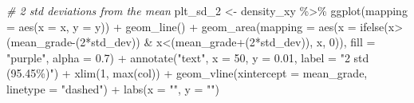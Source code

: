 \documentclass[
]{article}
\newenvironment{Shaded}{\begin{snugshade}}{\end{snugshade}}
\newcommand{\AttributeTok}[1]{\textcolor[rgb]{0.77,0.63,0.00}{#1}}
\newcommand{\CommentTok}[1]{\textcolor[rgb]{0.56,0.35,0.01}{\textit{#1}}}
\newcommand{\DecValTok}[1]{\textcolor[rgb]{0.00,0.00,0.81}{#1}}
\newcommand{\FloatTok}[1]{\textcolor[rgb]{0.00,0.00,0.81}{#1}}
\newcommand{\FunctionTok}[1]{\textcolor[rgb]{0.00,0.00,0.00}{#1}}
\newcommand{\NormalTok}[1]{#1}
\newcommand{\OtherTok}[1]{\textcolor[rgb]{0.56,0.35,0.01}{#1}}
\newcommand{\SpecialCharTok}[1]{\textcolor[rgb]{0.00,0.00,0.00}{#1}}
\newcommand{\StringTok}[1]{\textcolor[rgb]{0.31,0.60,0.02}{#1}}
\begin{document}
\begin{Shaded}
\begin{Highlighting}[]
\CommentTok{\# 2 std deviations from the mean}
\NormalTok{plt\_sd\_2 }\OtherTok{\textless{}{-}}\NormalTok{ density\_xy }\SpecialCharTok{\%\textgreater{}\%}
  \FunctionTok{ggplot}\NormalTok{(}\AttributeTok{mapping =} \FunctionTok{aes}\NormalTok{(}\AttributeTok{x =}\NormalTok{ x, }\AttributeTok{y =}\NormalTok{ y)) }\SpecialCharTok{+}
  \FunctionTok{geom\_line}\NormalTok{() }\SpecialCharTok{+}
  \FunctionTok{geom\_area}\NormalTok{(}\AttributeTok{mapping =} \FunctionTok{aes}\NormalTok{(}\AttributeTok{x =} \FunctionTok{ifelse}\NormalTok{(x}\SpecialCharTok{\textgreater{}}\NormalTok{(mean\_grade}\SpecialCharTok{{-}}\NormalTok{(}\DecValTok{2}\SpecialCharTok{*}\NormalTok{std\_dev)) }\SpecialCharTok{\&}\NormalTok{ x}\SpecialCharTok{\textless{}}\NormalTok{(mean\_grade}\SpecialCharTok{+}\NormalTok{(}\DecValTok{2}\SpecialCharTok{*}\NormalTok{std\_dev)), x, }\DecValTok{0}\NormalTok{)), }\AttributeTok{fill =} \StringTok{"purple"}\NormalTok{, }\AttributeTok{alpha =} \FloatTok{0.7}\NormalTok{) }\SpecialCharTok{+}
  \FunctionTok{annotate}\NormalTok{(}\StringTok{"text"}\NormalTok{, }\AttributeTok{x =} \DecValTok{50}\NormalTok{, }\AttributeTok{y =} \FloatTok{0.01}\NormalTok{, }\AttributeTok{label =} \StringTok{"2 std (95.45\%)"}\NormalTok{) }\SpecialCharTok{+}
  \FunctionTok{xlim}\NormalTok{(}\DecValTok{1}\NormalTok{, }\FunctionTok{max}\NormalTok{(col)) }\SpecialCharTok{+}
  \FunctionTok{geom\_vline}\NormalTok{(}\AttributeTok{xintercept =}\NormalTok{ mean\_grade, }\AttributeTok{linetype =} \StringTok{"dashed"}\NormalTok{) }\SpecialCharTok{+}
  \FunctionTok{labs}\NormalTok{(}\AttributeTok{x =} \StringTok{""}\NormalTok{, }\AttributeTok{y =} \StringTok{""}\NormalTok{)}



\end{Highlighting}
\end{Shaded}
\end{document}
